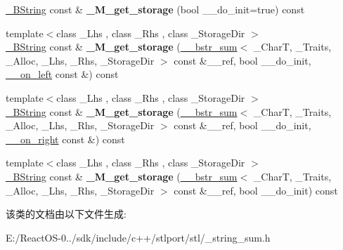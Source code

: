 \begin{DoxyCompactItemize}
\hyperlink{classbasic__string}{\+\_\+\+B\+String} const  \& {\bfseries \+\_\+\+M\+\_\+get\+\_\+storage} (bool \+\_\+\+\_\+do\+\_\+init=true) const
\item 
\mbox{\label{class____bstr__sum_afc101218b7747f16db90c3d7a570e20a}} 
{\footnotesize template$<$class \+\_\+\+Lhs , class \+\_\+\+Rhs , class \+\_\+\+Storage\+Dir $>$ }\\\hyperlink{classbasic__string}{\+\_\+\+B\+String} const  \& {\bfseries \+\_\+\+M\+\_\+get\+\_\+storage} (\hyperlink{class____bstr__sum}{\+\_\+\+\_\+bstr\+\_\+sum}$<$ \+\_\+\+CharT, \+\_\+\+Traits, \+\_\+\+Alloc, \+\_\+\+Lhs, \+\_\+\+Rhs, \+\_\+\+Storage\+Dir $>$ const \&\+\_\+\+\_\+ref, bool \+\_\+\+\_\+do\+\_\+init, \hyperlink{struct____on__left}{\+\_\+\+\_\+on\+\_\+left} const \&) const
\item 
\mbox{\label{class____bstr__sum_aaf064a95d6f507cf7e1c8a47c2929e9c}} 
{\footnotesize template$<$class \+\_\+\+Lhs , class \+\_\+\+Rhs , class \+\_\+\+Storage\+Dir $>$ }\\\hyperlink{classbasic__string}{\+\_\+\+B\+String} const  \& {\bfseries \+\_\+\+M\+\_\+get\+\_\+storage} (\hyperlink{class____bstr__sum}{\+\_\+\+\_\+bstr\+\_\+sum}$<$ \+\_\+\+CharT, \+\_\+\+Traits, \+\_\+\+Alloc, \+\_\+\+Lhs, \+\_\+\+Rhs, \+\_\+\+Storage\+Dir $>$ const \&\+\_\+\+\_\+ref, bool \+\_\+\+\_\+do\+\_\+init, \hyperlink{struct____on__right}{\+\_\+\+\_\+on\+\_\+right} const \&) const
\item 
\mbox{\label{class____bstr__sum_a4dbe68eed002aad437f4f5f61bfa436b}} 
{\footnotesize template$<$class \+\_\+\+Lhs , class \+\_\+\+Rhs , class \+\_\+\+Storage\+Dir $>$ }\\\hyperlink{classbasic__string}{\+\_\+\+B\+String} const  \& {\bfseries \+\_\+\+M\+\_\+get\+\_\+storage} (\hyperlink{class____bstr__sum}{\+\_\+\+\_\+bstr\+\_\+sum}$<$ \+\_\+\+CharT, \+\_\+\+Traits, \+\_\+\+Alloc, \+\_\+\+Lhs, \+\_\+\+Rhs, \+\_\+\+Storage\+Dir $>$ const \&\+\_\+\+\_\+ref, bool \+\_\+\+\_\+do\+\_\+init) const
\end{DoxyCompactItemize}


该类的文档由以下文件生成\+:\begin{DoxyCompactItemize}
\item 
E\+:/\+React\+O\+S-\/0../sdk/include/c++/stlport/stl/\+\_\+string\+\_\+sum.\+h\end{DoxyCompactItemize}
